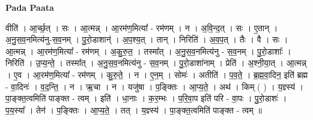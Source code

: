 \documentclass[17pt]{extarticle}
\begin{document}
\textbf{Pada Paata} \newline

वीति॑ । आ॒र्च्छ॒त् । सः । आ॒त्मन्न् । आ॒रम॑ण॒मित्या᳚ - रम॑णम् । न । अ॒वि॒न्द॒त् । सः । ए॒तान् । अ॒नु॒स॒व॒नमित्य॑नु-स॒व॒नम् । पु॒रो॒डाशान्॑ । अ॒प॒श्य॒त् । तान् । निरिति॑ । अ॒व॒प॒त् । तैः । वै । सः । आ॒त्मन्न् । आ॒रम॑ण॒मित्या᳚ - रम॑णम् । अ॒कु॒रु॒त॒ । तस्मा᳚त् । अ॒नु॒स॒व॒नमित्य॑नु - स॒व॒नम् । पु॒रो॒डाशाः᳚ । निरिति॑ । उ॒प्य॒न्ते॒ । तस्मा᳚त् । अ॒नु॒स॒व॒नमित्य॑नु - स॒व॒नम् । पु॒रो॒डाशा॑नाम् । प्रेति॑ । अ॒श्नी॒या॒त् । आ॒त्मन्न् । ए॒व । आ॒रम॑ण॒मित्या᳚ - रम॑णम् । कु॒रु॒ते॒ । न । ए॒न॒म् । सोमः॑ । अतीति॑ । प॒व॒ते॒ । ब्र॒ह्म॒वा॒दिन॒ इति॑ ब्रह्म - वा॒दिनः॑ । व॒द॒न्ति॒ । न । ऋ॒चा । न । यजु॑षा । प॒ङ्क्तिः । आ॒प्य॒ते॒ । अथ॑ । किम् ( ) । य॒ज्ञ्स्य॑ । पा॒ङ्क्त॒त्वमिति॑ पाङ्क्त - त्वम् । इति॑ । धा॒नाः । क॒र॒म्भः । प॒रि॒वा॒प इति॑ परि - वा॒पः । पु॒रो॒डाशः॑ । प॒य॒स्या᳚ । तेन॑ । प॒ङ्क्तिः । आ॒प्य॒ते॒ । तत् । य॒ज्ञ्स्य॑ । पा॒ङ्क्त॒त्वमिति॑ पाङ्क्त - त्वम् ॥  \newline
\end{document}
